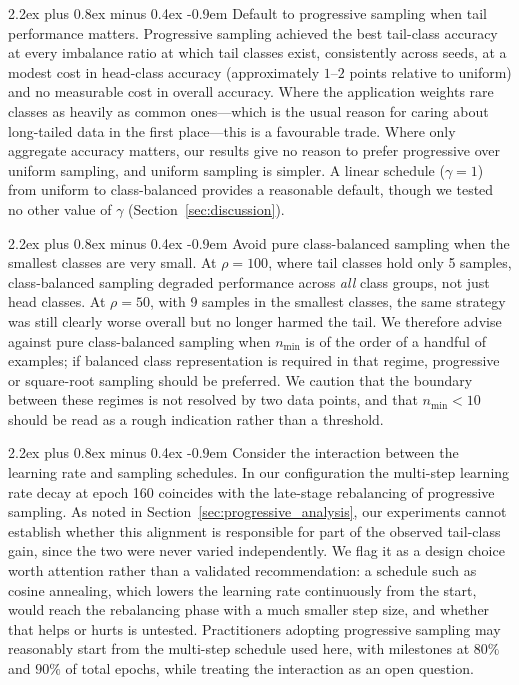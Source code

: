 \documentclass[12pt,a4paper]{article}
\makeatletter
\renewcommand{\paragraph}{\@startsection{paragraph}{4}{\z@}%
  {2.2ex plus 0.8ex minus 0.4ex}%
  {-0.9em}%
  {\normalfont\normalsize\bfseries}}
\makeatother
\begin{document}
\paragraph{Default to progressive sampling when tail performance matters.} Progressive sampling achieved the best tail-class accuracy at every imbalance ratio at which tail classes exist, consistently across seeds, at a modest cost in head-class accuracy (approximately $1$--$2$ points relative to uniform) and no measurable cost in overall accuracy. Where the application weights rare classes as heavily as common ones---which is the usual reason for caring about long-tailed data in the first place---this is a favourable trade. Where only aggregate accuracy matters, our results give no reason to prefer progressive over uniform sampling, and uniform sampling is simpler. A linear schedule ($\gamma = 1$) from uniform to class-balanced provides a reasonable default, though we tested no other value of $\gamma$ (Section~\ref{sec:discussion}).

\paragraph{Avoid pure class-balanced sampling when the smallest classes are very small.} At $\rho = 100$, where tail classes hold only 5 samples, class-balanced sampling degraded performance across \emph{all} class groups, not just head classes. At $\rho = 50$, with 9 samples in the smallest classes, the same strategy was still clearly worse overall but no longer harmed the tail. We therefore advise against pure class-balanced sampling when $n_{\min}$ is of the order of a handful of examples; if balanced class representation is required in that regime, progressive or square-root sampling should be preferred. We caution that the boundary between these regimes is not resolved by two data points, and that $n_{\min} < 10$ should be read as a rough indication rather than a threshold.

\paragraph{Consider the interaction between the learning rate and sampling schedules.} In our configuration the multi-step learning rate decay at epoch 160 coincides with the late-stage rebalancing of progressive sampling. As noted in Section~\ref{sec:progressive_analysis}, our experiments cannot establish whether this alignment is responsible for part of the observed tail-class gain, since the two were never varied independently. We flag it as a design choice worth attention rather than a validated recommendation: a schedule such as cosine annealing, which lowers the learning rate continuously from the start, would reach the rebalancing phase with a much smaller step size, and whether that helps or hurts is untested. Practitioners adopting progressive sampling may reasonably start from the multi-step schedule used here, with milestones at $80\%$ and $90\%$ of total epochs, while treating the interaction as an open question.
\end{document}
